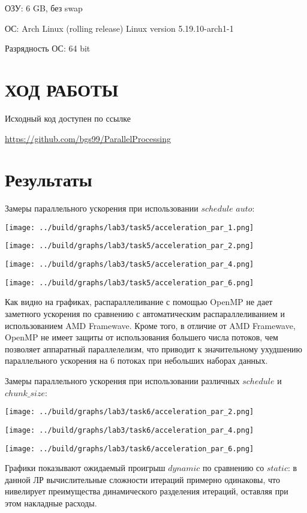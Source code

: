 \documentclass[14pt, a4paper, oneside, final]{extarticle}
\begin{document}
ОЗУ: 6 GB, без swap

ОС: Arch Linux (rolling release) Linux version 5.19.10-arch1-1

Разрядность ОС: 64 bit


\clearpage
\section*{ХОД РАБОТЫ}
Исходный код доступен по ссылке

\url{https://github.com/bgs99/ParallelProcessing}

\clearpage

\section*{Результаты}

Замеры параллельного ускорения при использовании $schedule$ $auto$:

\texttt{[image: ../build/graphs/lab3/task5/acceleration\_par\_1.png]}

\texttt{[image: ../build/graphs/lab3/task5/acceleration\_par\_2.png]}

\texttt{[image: ../build/graphs/lab3/task5/acceleration\_par\_4.png]}

\texttt{[image: ../build/graphs/lab3/task5/acceleration\_par\_6.png]}

Как видно на графиках, распараллеливание с помощью OpenMP не дает заметного ускорения по сравнению с автоматическим распараллеливанием и использованием AMD Framewave. Кроме того, в отличие от AMD Framewave, OpenMP не имеет защиты от использования большего числа потоков, чем позволяет аппаратный параллелелизм, что приводит к значительному ухудшению параллельного ускорения на 6 потоках при небольших наборах данных.

Замеры параллельного ускорения при использовании различных $schedule$ и $chunk\_size$:

\texttt{[image: ../build/graphs/lab3/task6/acceleration\_par\_2.png]}

\texttt{[image: ../build/graphs/lab3/task6/acceleration\_par\_4.png]}

\texttt{[image: ../build/graphs/lab3/task6/acceleration\_par\_6.png]}

Графики показывают ожидаемый проигрыш $dynamic$ по сравнению со $static$: в данной ЛР вычислительные сложности итераций примерно одинаковы, что нивелирует преимущества динамического разделения итераций, оставляя при этом накладные расходы.
\end{document}
